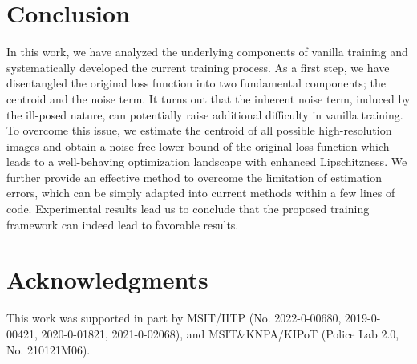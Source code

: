 \documentclass[letterpaper]{article} %
\begin{document}
\section{Conclusion}
In this work, we have analyzed the underlying components of vanilla training and systematically developed the current training process.
%
As a first step, we have disentangled the original loss function into two fundamental components; the centroid and the noise term.
%
It turns out that the inherent noise term, induced by the ill-posed nature, can potentially raise additional difficulty in vanilla training.
%
To overcome this issue, we estimate the centroid of all possible high-resolution images and obtain a noise-free lower bound of the original loss function which leads to a well-behaving optimization landscape with enhanced Lipschitzness.
%
We further provide an effective method to overcome the limitation of estimation errors, which can be simply adapted into current methods within a few lines of code.
%
Experimental results lead us to conclude that the proposed training framework can indeed lead to favorable results.
%


\section*{Acknowledgments}
This work was supported in part by MSIT/IITP (No. 2022-0-00680, 2019-0-00421, 2020-0-01821, 2021-0-02068), and MSIT\&KNPA/KIPoT (Police Lab 2.0, No. 210121M06).

\clearpage








\end{document}
